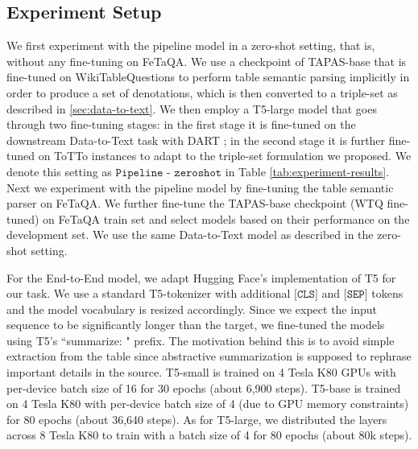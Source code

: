 \documentclass[11pt,a4paper]{article}
\newcommand{\ours}{FeTaQA\xspace}
\begin{document}
\subsection{Experiment Setup}
We first experiment with the pipeline model in a zero-shot setting, that is, without any fine-tuning on \ours. We use a checkpoint of TAPAS-base that is fine-tuned on WikiTableQuestions \cite{pasupat-liang-2015-compositional} to perform table semantic parsing implicitly in order to produce a set of denotations, which is then converted to a triple-set as described in \ref{sec:data-to-text}. We then employ a T5-large model \cite{raffel-2019-t5} that goes through two fine-tuning stages: in the first stage it is fine-tuned on the downstream Data-to-Text task with DART \cite{dart};
in the second stage it is further fine-tuned on ToTTo instances to adapt to the triple-set formulation we proposed. 
We denote this setting as $\texttt{Pipeline - zeroshot}$ in Table \ref{tab:experiment-results}. 
Next we experiment with the pipeline model by fine-tuning the table semantic parser on \ours. We further fine-tune the TAPAS-base checkpoint (WTQ fine-tuned) on \ours train set and select models based on their performance on the development set. We use the same Data-to-Text model as described in the zero-shot setting.

For the End-to-End model, we adapt
Hugging Face's implementation \cite{wolf-etal-2020-transformers} of T5 \cite{raffel-2019-t5} for our task. We use a standard T5-tokenizer with additional $\texttt{[CLS]}$ and $\texttt{[SEP]}$ tokens and the model vocabulary is resized accordingly. Since we expect the input sequence to be significantly longer than the target, we fine-tuned the models using T5's ``summarize: " prefix. The motivation behind this is to avoid simple extraction from the table since abstractive summarization is supposed to rephrase important details in the source.
T5-small is trained on 4 Tesla K80 GPUs with per-device batch size of 16 for 30 epochs (about 6,900 steps). T5-base is trained on 4 Tesla K80 with per-device batch size of 4 (due to GPU memory constraints) for 80 epochs (about 36,640 steps). As for T5-large, we distributed the layers across 8 Tesla K80 to train with a batch size of 4 for 80 epochs (about 80k steps).
\end{document}
